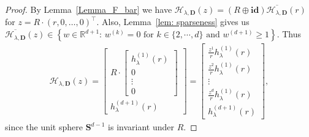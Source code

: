 \documentclass[11pt,a4paper,english,reqno]{amsart}
\theoremstyle{plain}
\newcommand{\1}{\mathbbm{1}}
\newcommand{\sph}{{\mathbf{S}^{d-1}}}
\begin{document}
\begin{proof} By Lemma~\ref{Lemma_F_bar} we have $
{\mathcal{H}_{\lambda, \mathbf{D}}}(z) = \left(R \oplus \mathbf{id} \right) \overline{\mathcal{H}_{\lambda, \mathbf{D}}}(r)$ for $z =R\cdot(r,0,\ldots,0)^\top$. Also,  Lemma~\ref{lem: sparseness} gives us $
\overline{\mathcal{H}_{\lambda, \mathbf{D}}}(z) \in \left\{ w \in \mathbb{R}^{d+1}:\, w^{(k)} = 0\text{ for } k \in \{2, \cdots, d\} \text{ and }  w^{(d+1)}\geq 1\right\}.$ Thus
\begin{align*}
    {\mathcal{H}_{\lambda, \mathbf{D}}}(z) =\begin{bmatrix}
    R \cdot \begin{bmatrix}
    h_\lambda^{(1)}(r)\\
    0\\
    \vdots\\
    0
    \end{bmatrix} \\
 h_\lambda^{(d+1)}(r)
    \end{bmatrix} = \begin{bmatrix}
\frac{z^{1}}{r}h_{ \lambda}^{(1)}(r) \\\frac{z^{2}}{r}h_{ \lambda}^{(1)}(r)\\ \vdots \\\frac{z^{d}}{r}h_{ \lambda}^{(1)}(r)\\h^{(d+1)}_{\lambda}(r) \end{bmatrix},
\end{align*}
since the unit sphere $\sph$ is invariant under $R$.



\end{proof}
\end{document}
